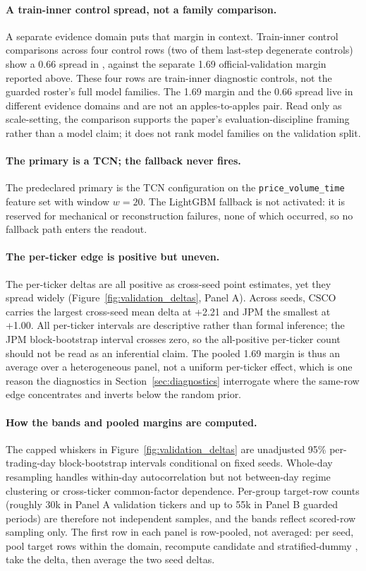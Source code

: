 \paragraph{A train-inner control spread, not a family comparison.}
A separate evidence domain puts that margin in context. Train-inner control
comparisons across four control rows (two of them last-step degenerate controls)
show a 0.66\pp{} spread in \macrofone, against the separate 1.69\pp{}
official-validation margin reported above. These four rows are train-inner
diagnostic controls, not the guarded roster's full model families. The 1.69\pp{}
margin and the 0.66\pp{} spread live in different evidence domains and are not an
apples-to-apples pair. Read only as scale-setting, the comparison supports the
paper's evaluation-discipline framing rather than a model claim; it does not
rank model families on the validation split.

\paragraph{The primary is a TCN; the fallback never fires.}
The predeclared primary is the TCN configuration on the
\texttt{price\_volume\_time} feature set with window $w=20$. The LightGBM
fallback is not activated: it is reserved for mechanical or reconstruction
failures, none of which occurred, so no fallback path enters the readout.

\paragraph{The per-ticker edge is positive but uneven.}
The per-ticker deltas are all positive as cross-seed point estimates, yet they
spread widely (Figure~\ref{fig:validation_deltas}, Panel A). Across seeds, CSCO
carries the largest cross-seed mean delta at +2.21\pp{} and JPM the smallest at
+1.00\pp. All per-ticker intervals are descriptive rather than formal
inference; the JPM block-bootstrap interval crosses zero, so the all-positive
per-ticker count should not be read as an inferential claim. The pooled
1.69\pp{} margin is thus an average over a heterogeneous panel, not a uniform
per-ticker effect, which is one reason the diagnostics in
Section~\ref{sec:diagnostics} interrogate where the same-row edge concentrates
and inverts below the random prior.

\paragraph{How the bands and pooled margins are computed.}
The capped whiskers in Figure~\ref{fig:validation_deltas} are unadjusted
95\% per-trading-day block-bootstrap intervals conditional on fixed seeds.
Whole-day resampling handles within-day autocorrelation but not between-day
regime clustering or cross-ticker common-factor dependence. Per-group
target-row counts (roughly 30k in Panel A validation tickers and up to 55k in
Panel B guarded periods) are therefore not independent samples, and the bands
reflect scored-row sampling only. The first row in each panel is row-pooled,
not averaged: per seed, pool target rows within the domain, recompute candidate
and stratified-dummy \macrofone{}, take the delta, then average the two seed
deltas.

